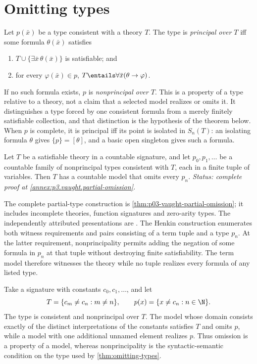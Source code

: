 \section{Omitting types}
\label{sec:types-ultraproducts-03}
\label{sec:omitting-types}

\begin{definition}
\label{def:principal-type}
Let \(p(\bar x)\) be a type consistent with a theory \(T\).  The type is
\emph{principal over \(T\)} iff some formula \(\theta(\bar x)\) satisfies
\begin{enumerate}
  \item \(T\cup\{\exists\bar x\,\theta(\bar x)\}\) is satisfiable; and
  \item for every \(\varphi(\bar x)\in p\),
        \(T\entails\forall\bar x(\theta\to\varphi)\).
\end{enumerate}
If no such formula exists, \(p\) is \emph{nonprincipal over \(T\)}.  This is
a property of a type relative to a theory, not a claim that a selected model
realizes or omits it.  It distinguishes a type forced by one consistent
formula from a merely finitely satisfiable collection, and that distinction is
the hypothesis of the theorem below.  When \(p\) is complete, it is principal
iff its point is isolated in \(S_n(T)\): an isolating formula
\(\theta\) gives \(\{p\}=[\theta]\), and a basic open singleton gives such a
formula.
\end{definition}

\begin{theorem}
\label{thm:omitting-types}
Let \(T\) be a satisfiable theory in a countable signature, and let
\(p_0,p_1,\ldots\) be a countable family of nonprincipal types consistent
with \(T\), each in a finite tuple of variables.  Then \(T\) has a countable
model that omits every \(p_n\).
\textit{Status: complete proof at \cref{annex:p3.vaught.partial-omission}.}
\end{theorem}

The complete partial-type construction is
\cref{thm:p03-vaught-partial-omission}; it includes incomplete theories,
function signatures and zero-arity types. The independently attributed
presentations are \cite{Hodges1993,Marker2002}. The Henkin construction
enumerates both witness requirements and pairs consisting of a term tuple and
a type \(p_n\).  At the latter requirement, nonprincipality permits adding the
negation of some formula in \(p_n\) at that tuple without destroying finite
satisfiability.  The term model therefore witnesses the theory while no tuple
realizes every formula of any listed type.

\begin{example}
Take a signature with constants \(c_0,c_1,\ldots\), and let
\[
  T=\{c_m\ne c_n:m\ne n\},
  \qquad
  p(x)=\{x\ne c_n:n\in\N\}.
\]
The type is consistent and nonprincipal over \(T\).  The model whose domain
consists exactly of the distinct interpretations of the constants satisfies
\(T\) and omits \(p\), while a model with one additional unnamed element
realizes \(p\).  Thus omission is a property of a model, whereas
nonprincipality is the syntactic-semantic condition on the type used by
\cref{thm:omitting-types}.
\end{example}
